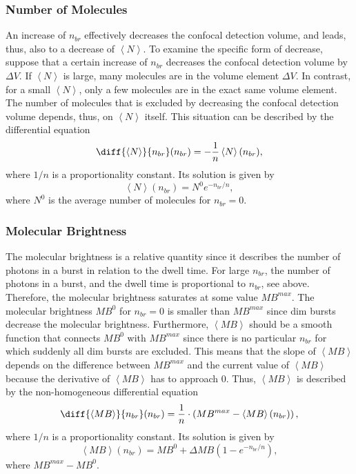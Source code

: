 \subsubsection{Number of Molecules}
An increase of $n_{br}$ effectively decreases the confocal detection volume, and leads, thus, also to a decrease of $\left\langle N \right\rangle$. To examine the specific form of decrease, suppose that a certain increase of $n_{br}$ decreases the confocal detection volume by $\Delta V$. If $\left\langle N \right\rangle$ is large, many molecules are in the volume element $\Delta V$. In contrast, for a small $\left\langle N \right\rangle$, only a few molecules are in the exact same volume element. The number of molecules that is excluded by decreasing the confocal detection volume depends, thus, on $\left\langle N \right\rangle$ itself. This situation can be described by the differential equation
\begin{equation}
	\diff{\left\langle N \right\rangle}{n_{br}}(n_{br}) = -\frac{1}{n} \left\langle N \right\rangle (n_{br}),
\end{equation}
where $1/ n$ is a proportionality constant. Its solution is given by 
\begin{equation}
	\left\langle N \right\rangle (n_{br}) = N^0 e^{-n_{br}/ n},
\end{equation}
where $N^0$ is the average number of molecules for $n_{br} = 0$.

\subsubsection{Molecular Brightness}

The molecular brightness is a relative quantity since it describes the number of photons in a burst in relation to the dwell time. For large $n_{br}$, the number of photons in a burst, and the dwell time is proportional to $n_{br}$, see above. Therefore, the molecular brightness saturates at some value $MB^{max}$. The molecular brightness $MB^0$ for $n_{br} = 0$ is smaller than $MB^{max}$ since dim bursts decrease the molecular brightness. Furthermore, $\left\langle MB \right\rangle$ should be a smooth function that connects $MB^0$ with $MB^{max}$ since there is no particular $n_{br}$ for which suddenly all dim bursts are excluded. This means that the slope of $\left\langle MB \right\rangle$ depends on the difference between $MB^{max}$ and the current value of $\left\langle MB \right\rangle$ because the derivative of $\left\langle MB \right\rangle$ has to approach $0$. Thus, $\left\langle MB \right\rangle$ is described by the non-homogeneous differential equation
\begin{equation}
	\diff{\left\langle MB \right\rangle}{n_{br}}(n_{br}) = \frac{1}{n} \cdot \left(MB^{max} - \left\langle MB \right\rangle(n_{br})\right),
\end{equation}
where $1/ n$ is a proportionality constant. Its solution is given by 
\begin{equation}
	\left\langle MB \right\rangle(n_{br}) = MB^0 + \Delta MB (1 - e^{-n_{br}/ n}),
\end{equation}
where $MB^{max} - MB^0$.
